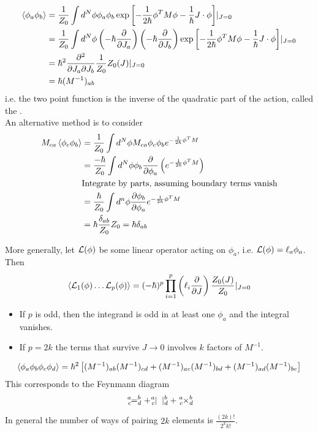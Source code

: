 \documentclass{article}
\begin{document}
\begin{example}
\begin{align*}
    \braket{ \phi_a \phi_b } &= \frac{1}{Z_0} \int d^N \phi \phi_a \phi_b \exp\left[ -\frac{1}{2\hbar}\phi^T M \phi - \frac{1}{\hbar} J\cdot \phi \right] \rvert_{J=0} \\
    &= \frac{1}{Z_0} \int d^N \phi \left( -\hbar \pd{J_a} \right) \left( -\hbar \pd{J_b } \right) \exp\left[ -\frac{1}{2\hbar}\phi^T M \phi - \frac{1}{\hbar} J\cdot \phi \right] \rvert_{J=0} \\
    &= \hbar^2 \frac{\del^2}{\del J_a \del J_b} \frac{1}{Z_0} Z_0 (J) |_{J=0} \\
    &= \hbar (M^{-1})_{ab}
\end{align*}
i.e. the two point function is the inverse of the quadratic part of the action, called the . \\
An alternative method is to consider 
\begin{align*}
    M_{ca} \braket{ \phi_c \phi_b } &= \frac{1}{Z_0} \int d^N \phi M_{ca} \phi_c \phi_b e^{ -\frac{1}{2\hbar}\phi^T M} \\
    &= \frac{-\hbar}{Z_0} \int d^N\phi \phi_b \pd{\phi_a} \left( e^{ -\frac{1}{2\hbar}\phi^T M} \right) \\
    &\text{Integrate by parts, assuming boundary terms vanish} \\
    &= \frac{\hbar}{Z_0} \int d^n \phi \pd[\phi_b]{\phi_a} e^{ -\frac{1}{2\hbar}\phi^T M} \\
    &= \hbar \frac{\delta_{ab}}{Z_0} Z_0 = \hbar \delta_{ab}
\end{align*}
\end{example}
More generally, let $\mc{L}(\phi)$ be some linear operator acting on $\phi_a$, i.e. $\mc{L}(\phi) = \ell_a \phi_a$. Then 
\[
\braket{ \mc{L}_1(\phi) \dots \mc{L}_p(\phi) } = (-\hbar)^p \prod_{i=1}^p  \left( \ell_i \pd{J} \right) \frac{Z_0(J)}{Z_0} \rvert_{J=0}
\]
\begin{itemize}
    \item If $p$ is odd, then the integrand is odd in at least one $\phi_a$ and the integral vanishes. 
    \item If $p=2k$ the terms that survive $J\to0$ involves $k$ factors of $M^{-1}$.
\end{itemize}

\begin{example}
\[
\braket{ \phi_a \phi_b \phi_c \phi_d } = \hbar^2 \left[ (M^{-1})_{ab}(M^{-1})_{cd}+(M^{-1})_{ac}(M^{-1})_{bd}+(M^{-1})_{ad}(M^{-1})_{bc} \right]
\]
This corresponds to the Feynmann diagram
\[
\tensor*[^a_c]{=}{^b_d} + \tensor*[^a_c]{|\phantom{x}|}{^b_d} + \tensor*[^a_c]{\times}{^b_d}
\]
\end{example}
In general the number of ways of pairing $2k$ elements is $\frac{(2k)!}{2^k k!}$.
\end{document}
